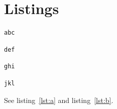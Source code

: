 \documentclass{article}
\begin{document}
\lstlistoflistings

\section{Listings}

\begin{lstlisting}[caption={A listing},label=lst:a]
abc
\end{lstlisting}

\begin{lstlisting}[title={A title}]
def
\end{lstlisting}

\begin{lstlisting}[float=htbp,caption={A floating listing},label=lst:b]
ghi
\end{lstlisting}

\begin{lstlisting}[float=htbp,title={A floating title}]
jkl
\end{lstlisting}

See listing~\ref{lst:a} and listing~\ref{lst:b}.
\end{document}
